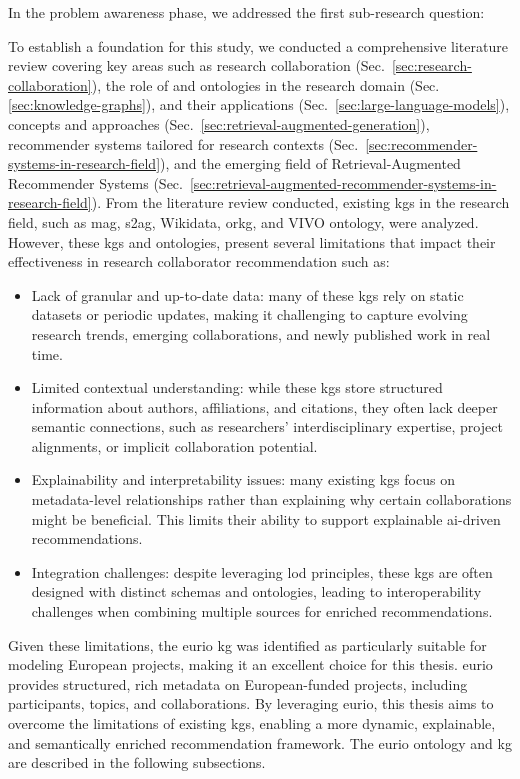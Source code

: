 In the problem awareness phase, we addressed the first sub-research question:
\begin{center}
    \rqOne
\end{center}
To establish a foundation for this study, we conducted a comprehensive literature review covering key areas such as research collaboration (Sec.~\ref{sec:research-collaboration}), the role of  and ontologies in the research domain (Sec.\ref{sec:knowledge-graphs}),  and their applications (Sec.~\ref{sec:large-language-models}),  concepts and approaches (Sec.~\ref{sec:retrieval-augmented-generation}), recommender systems tailored for research contexts (Sec.~\ref{sec:recommender-systems-in-research-field}), and the emerging field of Retrieval-Augmented Recommender Systems (Sec.~\ref{sec:retrieval-augmented-recommender-systems-in-research-field}).
From the literature review conducted, existing \glspl{kg} in the research field, such as \gls{mag}, \gls{s2ag}, Wikidata, \gls{orkg}, and VIVO ontology, were analyzed.
However, these \glspl{kg} and ontologies, present several limitations that impact their effectiveness in research collaborator recommendation such as:
\begin{itemize}
    \item Lack of granular and up-to-date data: many of these \glspl{kg} rely on static datasets or periodic updates, making it challenging to capture evolving research trends, emerging collaborations, and newly published work in real time.
    \item Limited contextual understanding: while these \glspl{kg} store structured information about authors, affiliations, and citations, they often lack deeper semantic connections, such as researchers' interdisciplinary expertise, project alignments, or implicit collaboration potential.
    \item Explainability and interpretability issues: many existing \glspl{kg} focus on metadata-level relationships rather than explaining why certain collaborations might be beneficial. This limits their ability to support explainable \gls{ai}-driven recommendations.
    \item Integration challenges: despite leveraging \gls{lod} principles, these \glspl{kg} are often designed with distinct schemas and ontologies, leading to interoperability challenges when combining multiple sources for enriched recommendations.
\end{itemize}

Given these limitations, the \gls{eurio} \gls{kg} was identified as particularly suitable for modeling European projects, making it an excellent choice for this thesis.
\gls{eurio} provides structured, rich metadata on European-funded projects, including participants, topics, and collaborations.
By leveraging \gls{eurio}, this thesis aims to overcome the limitations of existing \glspl{kg}, enabling a more dynamic, explainable, and semantically enriched recommendation framework.
The \gls{eurio} ontology and \gls{kg} are described in the following subsections.

